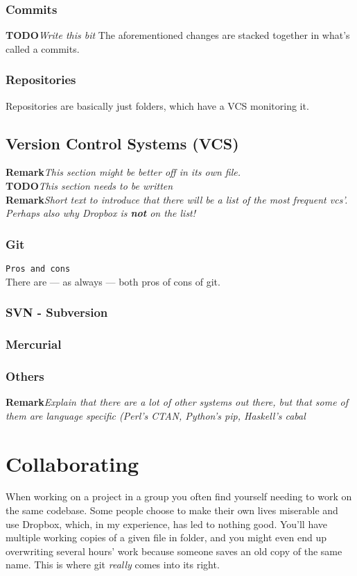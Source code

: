 \documentclass[11pt,a4paper,oneside,final,titlepage]{article}
\newcommand{\todo}[1]{\color{red}\textbf{TODO}\hspace{0.1in}\textit{#1}\color{black}}
\newcommand{\remark}[1]{\small\color{yellow}\textbf{Remark}\hspace{0.1in}\textit{#1}\color{black}\normalsize}
\begin{document}
\subsubsection[label=sec:repos]{Commits}
\todo{Write this bit}
The aforementioned changes are stacked together in what's called a commits.

\subsubsection{Repositories}
\label{sec:repos}Repositories are basically just folders, which have a VCS
monitoring it.\\


\subsection{Version Control Systems (VCS)}
\remark{This section might be better off in its own file.} \\
\todo{This section needs to be written}\\
\remark{Short text to introduce that there will be a list of the most frequent
        vcs'. Perhaps also why Dropbox is \textbf{not} on the list!} \\

\subsubsection{Git}
\texttt{Pros and cons} \\
There are --- as always --- both pros of cons of git.

\subsubsection{SVN - Subversion}

\subsubsection{Mercurial}

\subsubsection{Others}
\remark{Explain that there are a lot of other systems out there, but that some
        of them are language specific (Perl's CTAN, Python's pip, Haskell's
        cabal} \\

\section{Collaborating}
When working on a project in a group you often find yourself needing to work on
the same codebase. Some people choose to make their own lives miserable and use
Dropbox, which, in my experience, has led to nothing good. You'll have multiple
working copies of a given file in folder, and you might even end up overwriting
several hours' work because someone saves an old copy of the same name. This is
where git \emph{really} comes into its right.
\end{document}
